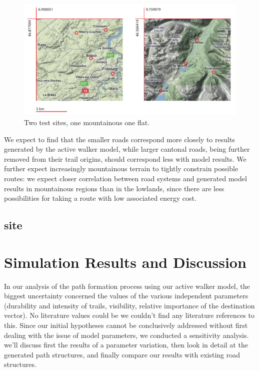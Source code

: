 \documentclass[a4paper, DIV11, abstracton]{scrartcl}
\begin{document}
\begin{figure}[tbp]
	\includegraphics[width=\linewidth]{../figures/site}
	\caption{Two test sites, one mountainous one flat.}
	\label{fig:site}
\end{figure}

We expect to find that the smaller roads correspond more closely to results generated by the active walker model, while larger cantonal roads, being further removed from their trail origins, should correspond less with model results. We further expect increasingly mountainous terrain to tightly constrain possible routes: we expect closer correlation between road systems and generated model results in mountainous regions than in the lowlands, since there are less possibilities for taking a route with low associated energy cost.


\subsection{site}







\section{Simulation Results and Discussion}
In our analysis of the path formation process using our active walker model, the biggest uncertainty concerned the values of the various independent parameters (durability and intensity of trails, visibility, relative importance of the destination vector). No literature values could be 
we couldn't find any literature references to this. Since our initial hypotheses cannot be conclusively addressed without first dealing with the issue of model parameters, we conducted a sensitivity analysis. we'll discuss first the results of a parameter variation, then look in detail at the generated path structures, and finally compare our results with existing road structures.
\end{document}
